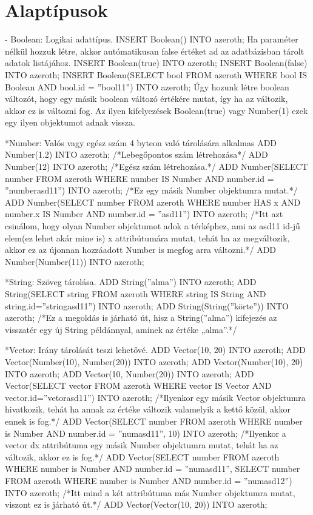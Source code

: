 
\section{Alaptípusok}

- Boolean: Logikai adattípus.
INSERT Boolean() INTO azeroth; 
Ha paraméter nélkül hozzuk létre, akkor autómatikusan false értéket ad az adatbázisban tárolt adatok listájához.
INSERT Boolean(true) INTO azeroth; 
INSERT Boolean(false) INTO azeroth;
INSERT Boolean(SELECT bool FROM azeroth WHERE bool IS Boolean AND bool.id = ”bool11”) INTO azeroth; 
Úgy hozunk létre boolean változót, hogy egy másik boolean változó értékére mutat, így ha az változik, akkor ez is változni fog.
Az ilyen kifelyezések Boolean(true) vagy Number(1) ezek egy ilyen objektumot adnak vissza.

*Number: Valós vagy egész szám 4 byteon való tárolására alkalmas
ADD Number(1.2) INTO azeroth;  /*Lebegőpontos szám létrehozása*/
ADD Number(12) INTO azeroth;  /*Egész szám létrehozása.*/
ADD Number(SELECT number FROM azeroth WHERE number IS Number AND number.id = ”numberasd11”) INTO azeroth; /*Ez egy másik Number objektumra mutat.*/
ADD Number(SELECT number FROM azeroth WHERE number HAS x AND number.x IS Number AND number.id = ”asd11”) INTO azeroth;  /*Itt azt csinálom, hogy olyan Number objektumot adok a térképhez, ami az asd11 id-jű elem(ez lehet akár mine is) x attribútumára mutat, tehát ha az megváltozik, akkor ez az újonnan hozzáadott Number is megfog arra változni.*/
ADD Number(Number(11)) INTO azeroth;


*String: Szöveg tárolása.
ADD String(”alma”) INTO azeroth;
ADD String(SELECT string FROM azeroth WHERE string IS String AND string.id=”stringasd11”) INTO azeroth;
ADD String(String(”körte”)) INTO azeroth; /*Ez a megoldás is járható út, hisz a String(”alma”) kifejezés az visszatér egy új String példánnyal, aminek az értéke „alma”.*/

*Vector: Irány tárolását teszi lehetővé.
ADD Vector(10, 20) INTO azeroth;
ADD Vector(Number(10), Number(20)) INTO azeroth;
ADD Vector(Number(10), 20) INTO azeroth;
ADD Vector(10, Number(20)) INTO azeroth;
ADD Vector(SELECT vector FROM azeroth WHERE vector IS Vector AND vector.id=”vetorasd11”) INTO azeroth; /*Ilyenkor egy másik Vector objektumra hivatkozik, tehát ha annak az értéke változik valamelyik a kettő közül, akkor ennek is fog.*/
ADD Vector(SELECT number FROM azeroth WHERE number is Number AND number.id = ”numasd11”, 10) INTO azeroth; /*Ilyenkor a vector dx attribútuma egy másik Number objektumra mutat, tehát ha az változik, akkor ez is fog.*/
ADD Vector(SELECT number FROM azeroth WHERE number is Number AND number.id = ”numasd11”, SELECT number FROM azeroth WHERE number is Number AND number.id = ”numasd12”) INTO azeroth;  /*Itt mind a két attribútuma más Number objektumra mutat, viszont ez is járható út.*/
ADD Vector(Vector(10, 20)) INTO azeroth;


